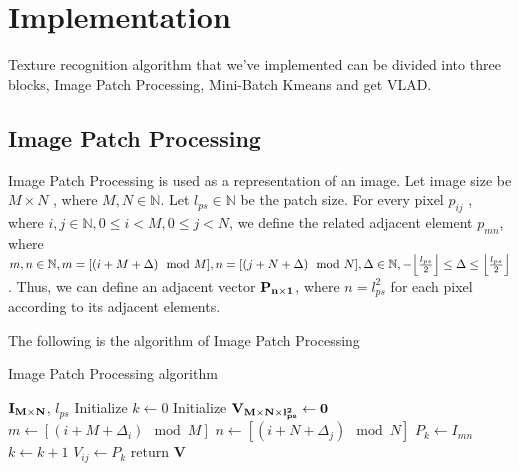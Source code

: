 \documentclass[final,leqno,onefignum,onetabnum]{siamltexmm}
\DeclarePairedDelimiter\floor{\lfloor}{\rfloor}
\begin{document}
\section {Implementation}

Texture recognition algorithm that we've implemented can be divided into three blocks, Image Patch Processing, Mini-Batch Kmeans and get VLAD.


\subsection {Image Patch Processing}


Image Patch Processing is used as a representation of an image. Let image size be $M \times N$ , where $M,N \in \mathbb{N}$. Let $l_{ps} \in \mathbb{N}$ be the patch size. 
For every pixel \(p_{ij}\) , where $i,j \in \mathbb{N}, 0 \leq i< M , 0 \leq j < N$, we define the related adjacent element \({p_{mn}}\), where $m,n \in \mathbb{N}, m=[(i+M+\Delta) \mod M], n=[(j+N+\Delta) \mod N], \Delta \in \mathbb{N}, -\floor*{\frac{l_{ps}}{2}} \leq \Delta \leq \floor*{\frac{l_{ps}}{2}} $. Thus, we can define an adjacent vector $\bf{P_{n \times 1}}$, where $n=l_{ps}^2$ for each pixel according to its adjacent elements.

The following is the algorithm of Image Patch Processing


\begin{algorithm}[H]
	\caption{Image Patch Processing algorithm}
	\label{pseudoImagePatchProcessing}
	\begin{algorithmic}[1]
		 {$\bf{I}_{M \times N}$, $l_{ps}$}
		\State Initialize $k \gets 0$
		\State Initialize $\bf{V}_{M \times N \times l_{ps}^2 } \gets 0$
		\State $ m \gets [ ( i+M+\Delta_i ) \mod M] $
		\State $ n \gets [ ( i+N+\Delta_j ) \mod N] $
		\State $P_k \gets I_{mn}$
		\State $k \gets k + 1$
		\EndFor
		\EndFor
		\State $V_{ij} \gets P_k$
		\EndFor
		\State return \bf{V}
		\EndProcedure
	\end{algorithmic}
\end{algorithm}
\end{document}
